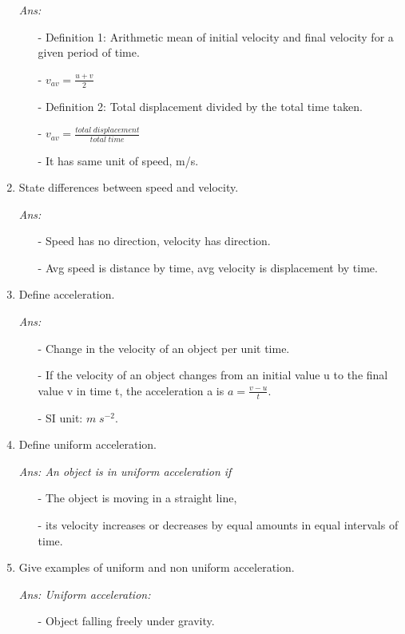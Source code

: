 \documentclass[12pt]{article}
\begin{document}
\begin{enumerate}
		{\itshape Ans:
			\begin{itemize}
				\item[-] Definition 1: Arithmetic mean of initial velocity and final velocity for a given period of time.
				\item[-] $v_{av} = \frac{u + v}{2}$
				\item[-] Definition 2: Total displacement divided by the total time taken.
				\item[-] $v_{av} = \frac{total \; displacement}{total \; time}$
				\item[-] It has same unit of speed, m/s.
			\end{itemize}
		}
	\item State differences between speed and velocity. \\
		{\itshape Ans:
			\begin{itemize}
				\item[-] Speed has no direction, velocity has direction.
				\item[-] Avg speed is distance by time, avg velocity is displacement by time.
			\end{itemize}
		}
	\item Define acceleration. \\
		{\itshape Ans:
			\begin{itemize}
				\item[-] Change in the velocity of an object per unit time.
				\item[-] If the velocity of an object changes from an initial value u
					to the final value v in time t, the acceleration a is
					$ a = \frac{v - u}{t} $.
				\item[-] SI unit: $ m \; s^{-2} $.
			\end{itemize}
		}
	\item Define uniform acceleration. \\
		{\itshape Ans: An object is in uniform acceleration if 
			\begin{itemize}
				\item[-] The object is moving in a straight line,
				\item[-] its velocity increases or decreases by equal
					amounts in equal intervals of time.
			\end{itemize}
		}
	\item Give examples of uniform and non uniform acceleration. \\
		{\itshape Ans:
			Uniform acceleration:
			\begin{itemize}
				\item[-] Object falling freely under gravity.

\end{itemize}}
\end{enumerate}
\end{document}
